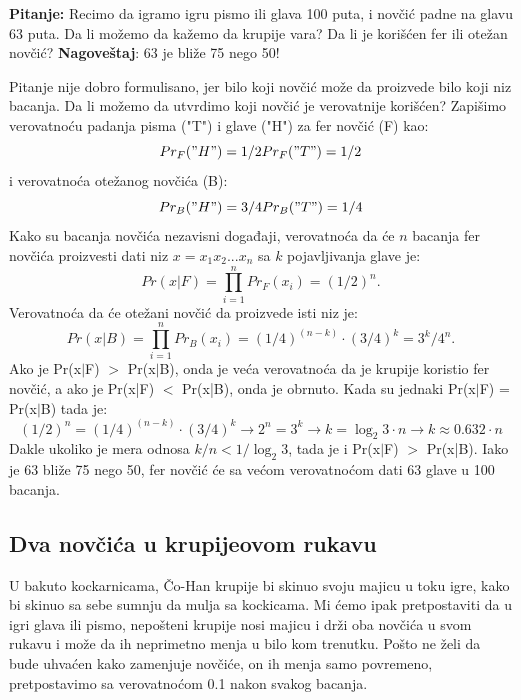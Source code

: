 \textbf{Pitanje:} Recimo da igramo igru pismo ili glava 100 puta, i novčić padne na glavu 63 puta. Da li možemo da kažemo da krupije vara? Da li je korišćen fer ili otežan novčić?
\textbf{Nagoveštaj}: 63 je bliže 75
nego 50!

Pitanje nije dobro formulisano, jer bilo koji novčić može da proizvede bilo koji niz bacanja. Da li možemo da utvrdimo koji novčić
je verovatnije korišćen? Zapišimo verovatnoću padanja pisma ("T") i glave ("H") za fer novčić (F) kao: 
\begin{equation}
Pr_F("H") = 1/2     Pr_F("T") = 1/2
\end{equation}
i verovatnoća otežanog novčića (B):
\begin{equation}
Pr_B("H") = 3/4     Pr_B("T") = 1/4
\end{equation}
Kako su bacanja novčića nezavisni događaji, verovatnoća da će $ n $ bacanja fer novčića proizvesti dati niz $ x= x_1x_2...x_n $ sa $ k $ pojavljivanja glave je:
\begin{equation}
Pr(x|F) = {\displaystyle \prod_{i=1}^n Pr_F(x_i)} = (1/2)^n.
\end{equation}
Verovatnoća da će otežani novčić da proizvede isti niz je:
\begin{equation}
Pr(x|B) = {\displaystyle \prod_{i=1}^n Pr_B(x_i)} = (1/4)^{(n-k)} \cdot (3/4)^k = 3^k/4^n.
\end{equation}
Ako je Pr(x$|$F) $>$ Pr(x$|$B), onda je veća verovatnoća da je krupije koristio fer novčić, a ako je Pr(x|F) $<$ Pr(x|B), onda je obrnuto.
Kada su jednaki Pr(x$|$F) = Pr(x$|$B) tada je:
\begin{equation}
(1/2)^n = (1/4)^{(n-k)} \cdot (3/4)^k \rightarrow 2^n = 3^k \rightarrow k = {\log_2 3} \cdot n \rightarrow k \approx 0.632 \cdot n
\end{equation}
Dakle ukoliko je mera odnosa $ k/n < 1/{\log_2 3}$, tada je i Pr(x$|$F) $>$ Pr(x|B).
Iako je 63 bliže 75 nego 50, fer novčić će sa većom verovatnoćom dati 63 glave u 100 bacanja.

\subsection{Dva novčića u krupijeovom rukavu}
U bakuto kockarnicama, Čo-Han krupije bi skinuo svoju majicu u toku igre, kako bi skinuo sa sebe sumnju da mulja sa kockicama. Mi ćemo ipak pretpostaviti da u igri glava ili pismo, nepošteni krupije nosi majicu i drži oba novčića u svom rukavu i može da ih neprimetno menja u bilo kom trenutku. Pošto ne želi da bude uhvaćen kako zamenjuje novčiće, on ih menja samo povremeno, pretpostavimo sa verovatnoćom 0.1 nakon svakog bacanja. 

